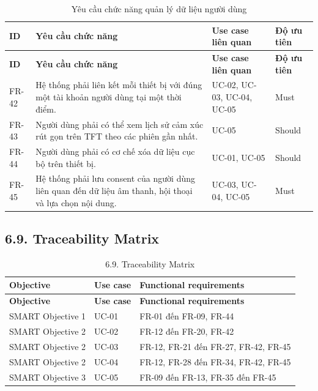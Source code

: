 \documentclass[12pt,a4paper]{article}
\begin{document}
\begin{center}
\scriptsize
\begin{longtable}{|P{0.12\textwidth}|P{0.44\textwidth}|P{0.24\textwidth}|P{0.12\textwidth}|}
\caption{Yêu cầu chức năng quản lý dữ liệu người dùng}\\
\hline
\textbf{ID} & \textbf{Yêu cầu chức năng} & \textbf{Use case liên quan} & \textbf{Độ ưu tiên} \\
\hline
\endfirsthead
\hline
\textbf{ID} & \textbf{Yêu cầu chức năng} & \textbf{Use case liên quan} & \textbf{Độ ưu tiên} \\
\hline
\endhead
FR-42 & Hệ thống phải liên kết mỗi thiết bị với đúng một tài khoản người dùng tại một thời điểm. & UC-02, UC-03, UC-04, UC-05 & Must \\
\hline
FR-43 & Người dùng phải có thể xem lịch sử cảm xúc rút gọn trên TFT theo các phiên gần nhất. & UC-05 & Should \\
\hline
FR-44 & Người dùng phải có cơ chế xóa dữ liệu cục bộ trên thiết bị. & UC-01, UC-05 & Should \\
\hline
FR-45 & Hệ thống phải lưu consent của người dùng liên quan đến dữ liệu âm thanh, hội thoại và lựa chọn nội dung. & UC-03, UC-04, UC-05 & Must \\
\hline
\end{longtable}
\normalsize
\end{center}
\subsection*{6.9. Traceability Matrix}

\begin{center}
\begin{longtable}{|P{0.25\textwidth}|P{0.32\textwidth}|P{0.33\textwidth}|}
\caption{6.9. Traceability Matrix}\\
\hline
\textbf{Objective} & \textbf{Use case} & \textbf{Functional requirements} \\
\hline
\endfirsthead
\hline
\textbf{Objective} & \textbf{Use case} & \textbf{Functional requirements} \\
\hline
\endhead
SMART Objective 1 & UC-01 & FR-01 đến FR-09, FR-44 \\
\hline
SMART Objective 2 & UC-02 & FR-12 đến FR-20, FR-42 \\
\hline
SMART Objective 2 & UC-03 & FR-12, FR-21 đến FR-27, FR-42, FR-45 \\
\hline
SMART Objective 2 & UC-04 & FR-12, FR-28 đến FR-34, FR-42, FR-45 \\
\hline
SMART Objective 3 & UC-05 & FR-09 đến FR-13, FR-35 đến FR-45 \\
\hline
\end{longtable}
\end{center}
\end{document}
